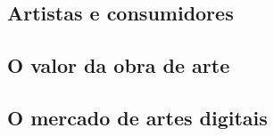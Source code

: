 \subsection{Artistas e consumidores}
\label{subsec: artistas e consumidores}

\subsection{O valor da obra de arte}
\label{subsec: o valor das obras}

\subsection{O mercado de artes digitais}
\label{subsec: o mercado digital}















